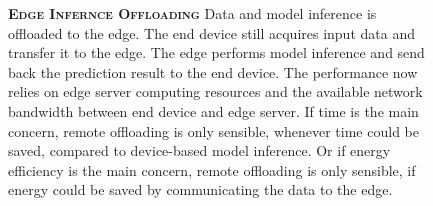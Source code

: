 \begin{figure}
	\begin{minipage}{0.3\linewidth}
		\centering
		\begin{figure}
			\centering
			\captionsetup[subfigure]{justification=centering}
		\end{figure}
	\end{minipage}
	\hfill
	\begin{minipage}{0.65\linewidth}
		\textbf{\protect{} \textsc{Edge Infernce Offloading}}
		\color{caption-color} \newline
		Data and model inference is offloaded to the edge. The end device still acquires input data and transfer it to the edge. The edge performs model inference and send back the prediction result to the end device. The performance now relies on edge server computing resources and the available network bandwidth between end device and edge server. If time is the main concern, remote offloading is only sensible, whenever time could be saved, compared to device-based model inference. Or if energy efficiency is the main concern, remote offloading is only sensible, if energy could be saved by communicating the data to the edge. 
	\end{minipage}
\end{figure}

